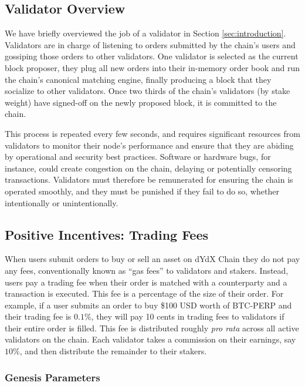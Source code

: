     \subsection{Validator Overview}

        We have briefly overviewed the job of a validator in Section \ref{sec:introduction}. Validators are in charge of listening to orders submitted by the chain's users and gossiping those orders to other validators. One validator is selected as the current block proposer, they plug all new orders into their in-memory order book and run the chain's canonical matching engine, finally producing a block that they socialize to other validators. Once two thirds of the chain's validators (by stake weight) have signed-off on the newly proposed block, it is committed to the chain. 

        This process is repeated every few seconds, and requires significant resources from validators to monitor their node's performance and ensure that they are abiding by operational and security best practices. Software or hardware bugs, for instance, could create congestion on the chain, delaying or potentially censoring transactions. Validators must therefore be remunerated for ensuring the chain is operated smoothly, and they must be punished if they fail to do so, whether intentionally or unintentionally.

    \subsection{Positive Incentives: Trading Fees} \label{subsec:tradingfees}

        When users submit orders to buy or sell an asset on dYdX Chain they do not pay any fees, conventionally known as ``gas fees'' to validators and stakers. Instead, users pay a trading fee when their order is matched with a counterparty and a transaction is executed. This fee is a percentage of the size of their order. For example, if a user submits an order to buy \$100 USD worth of BTC-PERP and their trading fee is $0.1\%$, they will pay 10 cents in trading fees to validators if their entire order is filled. This fee is distributed roughly \textit{pro rata} across all active validators on the chain. Each validator takes a commission on their earnings, say $10\%$, and then distribute the remainder to their stakers. 

        \subsubsection{Genesis Parameters}

